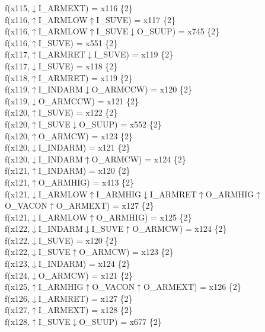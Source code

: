 f(x115,$\downarrow$I\_ARMEXT) = x116 \{2\} \\  
f(x116,$\uparrow$I\_ARMLOW$\uparrow$I\_SUVE) = x117 \{2\} \\  
f(x116,$\uparrow$I\_ARMLOW$\uparrow$I\_SUVE$\downarrow$O\_SUUP) = x745 \{2\} \\  
f(x116,$\uparrow$I\_SUVE) = x551 \{2\} \\  
f(x117,$\uparrow$I\_ARMRET$\downarrow$I\_SUVE) = x119 \{2\} \\  
f(x117,$\downarrow$I\_SUVE) = x118 \{2\} \\  
f(x118,$\uparrow$I\_ARMRET) = x119 \{2\} \\  
f(x119,$\uparrow$I\_INDARM$\downarrow$O\_ARMCCW) = x120 \{2\} \\  
f(x119,$\downarrow$O\_ARMCCW) = x121 \{2\} \\  
f(x120,$\uparrow$I\_SUVE) = x122 \{2\} \\  
f(x120,$\uparrow$I\_SUVE$\downarrow$O\_SUUP) = x552 \{2\} \\  
f(x120,$\uparrow$O\_ARMCW) = x123 \{2\} \\  
f(x120,$\downarrow$I\_INDARM) = x121 \{2\} \\  
f(x120,$\downarrow$I\_INDARM$\uparrow$O\_ARMCW) = x124 \{2\} \\  
f(x121,$\uparrow$I\_INDARM) = x120 \{2\} \\  
f(x121,$\uparrow$O\_ARMHIG) = x413 \{2\} \\  
f(x121,$\downarrow$I\_ARMLOW$\uparrow$I\_ARMHIG$\downarrow$I\_ARMRET$\uparrow$O\_ARMHIG$\uparrow$O\_VACON$\uparrow$O\_ARMEXT) = x127 \{2\} \\  
f(x121,$\downarrow$I\_ARMLOW$\uparrow$O\_ARMHIG) = x125 \{2\} \\  
f(x122,$\downarrow$I\_INDARM$\downarrow$I\_SUVE$\uparrow$O\_ARMCW) = x124 \{2\} \\  
f(x122,$\downarrow$I\_SUVE) = x120 \{2\} \\  
f(x122,$\downarrow$I\_SUVE$\uparrow$O\_ARMCW) = x123 \{2\} \\  
f(x123,$\downarrow$I\_INDARM) = x124 \{2\} \\  
f(x124,$\downarrow$O\_ARMCW) = x121 \{2\} \\  
f(x125,$\uparrow$I\_ARMHIG$\uparrow$O\_VACON$\uparrow$O\_ARMEXT) = x126 \{2\} \\  
f(x126,$\downarrow$I\_ARMRET) = x127 \{2\} \\  
f(x127,$\uparrow$I\_ARMEXT) = x128 \{2\} \\  
f(x128,$\uparrow$I\_SUVE$\downarrow$O\_SUUP) = x677 \{2\} \\  
